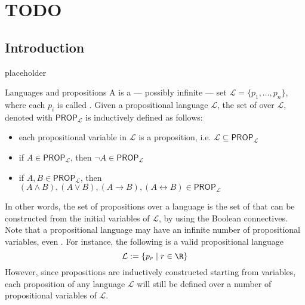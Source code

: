 \documentclass[a4paper, 12pt]{report}
\institute{\curlyquotes{\hspace{0.25mm}Sapienza} Università di Roma}
\subtitle{Appunti integrati con il libro \book}
\author{\textit{Autore}\\\authorName}
\institute{\curlyquotes{\hspace{0.25mm}Sapienza} University of Rome}
\subtitle{Lecture notes integrated with the book \book}
\author{\textit{Author}\\\authorName}
\title{\courseName}
\date{\today}
\begin{document}
    \maketitle

    {
        \hypersetup{allcolors=black}

        \romantableofcontents
    }

    \introduction


    \chapter{TODO}

    \section{Introduction}

    placeholder 

    \begin{frameddefn}{Languages and propositions}
        A  is a --- possibly infinite --- set $\mathcal L = \{p_1, \ldots, p_n\}$, where each $p_i$ is called . Given a propositional language $\mathcal L$, the set of  over $\mathcal L$, denoted with $\textsf{PROP}_{\mathcal L}$ is inductively defined as follows:

        \begin{itemize}
            \item each propositional variable in $\mathcal L$ is a proposition, i.e. $\mathcal L \subseteq \textsf{PROP}_{\mathcal L}$
            \item if $A \in \textsf{PROP}_{\mathcal L}$, then $\lnot A \in \textsf{PROP}_{\mathcal L}$
            \item if $A, B \in \textsf{PROP}_{\mathcal L}$, then $(A \land B), (A \lor B), (A \rightarrow B), (A \leftrightarrow B) \in \textsf{PROP}_{\mathcal L}$
        \end{itemize}
    \end{frameddefn}

    In other words, the set of propositions over a language is the set of  that can be constructed from the initial variables of $\mathcal L$, by using the Boolean connectives. Note that a propositional language may have an infinite number of propositional variables, even . For instance, the following is a valid propositional language $$\mathcal L := \{p_r \mid r \in \R\}$$ However, since propositions are inductively constructed starting from variables, each proposition of any language $\mathcal L$ will still be defined over a  number of propositional variables of $\mathcal L$.
\end{document}
